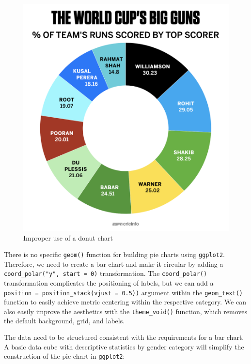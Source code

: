\documentclass[
]{book}
\begin{document}
\begin{figure}

{\centering \includegraphics[width=0.75\linewidth]{graphics/bad_viz-pie_chart} 

}

\caption{Improper use of a donut chart}\label{fig:bad-donut-chart}
\end{figure}

There is no specific \texttt{geom()} function for building pie charts using \texttt{ggplot2}. Therefore, we need to create a bar chart and make it circular by adding a \texttt{coord\_polar("y",\ start\ =\ 0)} transformation. The \texttt{coord\_polar()} transformation complicates the positioning of labels, but we can add a \texttt{position\ =\ position\_stack(vjust\ =\ 0.5))} argument within the \texttt{geom\_text()} function to easily achieve metric centering within the respective category. We can also easily improve the aesthetics with the \texttt{theme\_void()} function, which removes the default background, grid, and labels.

The data need to be structured consistent with the requirements for a bar chart. A basic data cube with descriptive statistics by gender category will simplify the construction of the pie chart in \texttt{ggplot2}:
\end{document}
